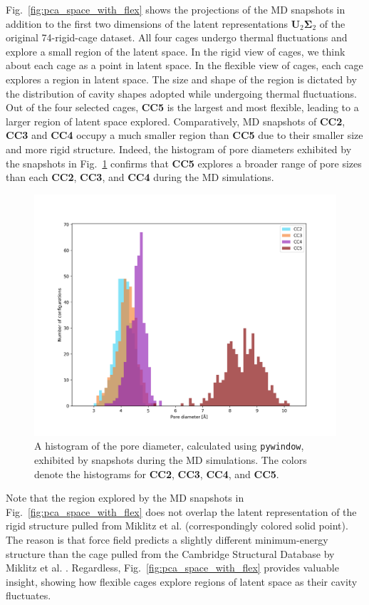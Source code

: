 \documentclass[journal=jacsat,manuscript=article]{achemso}
\begin{document}
{Fig.~\ref{fig:pca_space_with_flex} shows the projections of the MD snapshots in addition to the first two dimensions of the latent representations $\mathbf{U}_2\mathbf{\Sigma}_2$ of the original 74-rigid-cage dataset. All four cages undergo thermal fluctuations and explore a small region of the latent space. 
In the rigid view of cages, we think about each cage as a point in latent space. In the flexible view of cages, each cage explores a region in latent space. The size and shape of the region is dictated by the distribution of cavity shapes adopted while undergoing thermal fluctuations. Out of the four selected cages, \textbf{CC5} is the largest and most flexible, leading to a larger region of latent space explored. Comparatively, MD snapshots of \textbf{CC2}, \textbf{CC3} and \textbf{CC4} occupy a much smaller region than \textbf{CC5} due to their smaller size and more rigid structure. Indeed, the histogram of pore diameters exhibited by the snapshots in Fig.~\ref{fig:pore_diameter_histogram} confirms that \textbf{CC5} explores a broader range of pore sizes than each \textbf{CC2}, \textbf{CC3}, and \textbf{CC4} during the MD simulations.


\begin{figure}
\centering
	\includegraphics[width=0.65\columnwidth]{../pore_diameter_histogram.png}
	\caption{\color{red}A histogram of the pore diameter, calculated using \texttt{pywindow}, exhibited by snapshots during the MD simulations. The colors denote the histograms for \textbf{CC2}, \textbf{CC3}, \textbf{CC4}, and \textbf{CC5}.
	} \label{fig:pore_diameter_histogram}
\end{figure}

Note that the region explored by the MD snapshots in Fig.~\ref{fig:pca_space_with_flex} does not overlap the latent representation of the rigid structure pulled from Miklitz et al. \cite{miklitz2017computational} (correspondingly colored solid point). The reason is that force field predicts a slightly different minimum-energy structure than the cage pulled from the Cambridge Structural Database by Miklitz et al. \cite{miklitz2017computational}. Regardless, Fig.~\ref{fig:pca_space_with_flex} provides valuable insight, showing how flexible cages explore regions of latent space as their cavity fluctuates.
}
\end{document}
